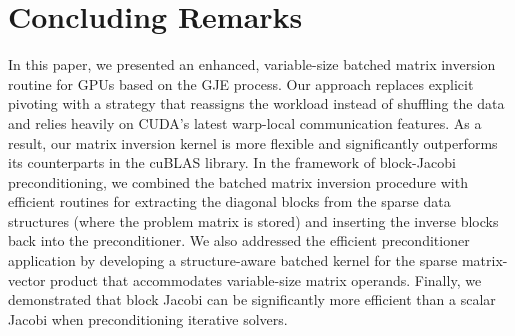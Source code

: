 \section{Concluding Remarks}
\label{2017-gje-block-jacobi:sec:s5-summary}
In this paper, we presented an enhanced, variable-size batched matrix inversion routine for
GPUs based on the GJE process. Our approach replaces
explicit pivoting with a strategy that reassigns the workload instead of
shuffling the data and relies heavily on CUDA's latest warp-local communication
features. As a result, our matrix inversion kernel is more flexible and
significantly outperforms its counterparts in the cuBLAS library.
In the framework of block-Jacobi preconditioning, we combined the batched matrix
inversion procedure with efficient routines for extracting the diagonal blocks
from the sparse data structures (where the problem matrix is stored) and inserting
the inverse blocks back into the preconditioner. We also addressed the efficient
preconditioner application
by developing a structure-aware batched kernel for the sparse matrix-vector
product that accommodates variable-size matrix operands. Finally, we
demonstrated that block Jacobi can be significantly more efficient than a scalar
Jacobi when preconditioning iterative solvers.
